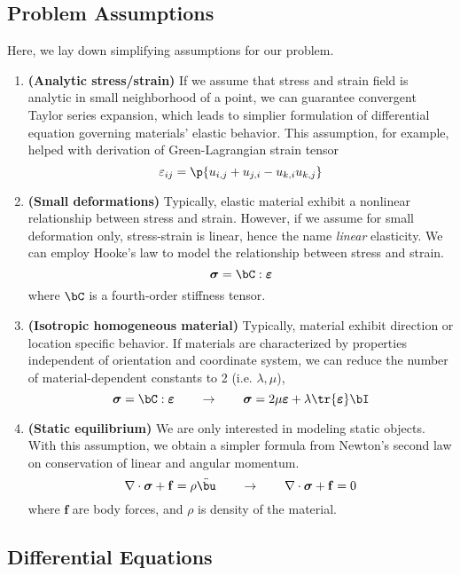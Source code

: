 \documentclass[11pt,titlepage]{article}
\newcommand{\bheading}[1]{\textbf{(#1)}}
\newcommand{\bsigma}{\boldsymbol{\sigma}}
\newcommand{\bepsilon}{\boldsymbol{\varepsilon}}
\renewcommand{\epsilon}{\varepsilon}
\renewcommand{\bf}{\mathbf{f}}
\begin{document}
\subsection{Problem Assumptions}

Here, we lay down simplifying assumptions for our problem.
\begin{enumerate}
    \item \bheading{Analytic stress/strain} If we assume that stress and strain field is analytic in small neighborhood of a point, we can guarantee convergent Taylor series expansion, which leads to simplier formulation of differential equation governing materials' elastic behavior. This assumption, for example, helped with derivation of Green-Lagrangian strain tensor
    \[
        \epsilon_{ij} = \p{u_{i,j} + u_{j,i} - u_{k,i}u_{k,j}}    
    \]
    \item \bheading{Small deformations} Typically, elastic material exhibit a nonlinear relationship between stress and strain. However, if we assume for small deformation only, stress-strain is linear, hence the name \textit{linear} elasticity. We can employ Hooke's law to model the relationship between stress and strain.
    \[
        \bsigma = \bC : \bepsilon
    \]
    where $\bC$ is a fourth-order stiffness tensor.
    \item \bheading{Isotropic homogeneous material} Typically, material exhibit direction or location specific behavior. If materials are characterized by properties independent of orientation and coordinate system, we can reduce the number of material-dependent constants to 2 (i.e. $\lambda,\mu$),
    \[
        \bsigma = \bC : \bepsilon
        \quad \quad \rightarrow \quad \quad
        \bsigma = 2\mu\bepsilon + \lambda \tr{\bepsilon} \bI
    \]
    \item \bheading{Static equilibrium} We are only interested in modeling static objects. With this assumption, we obtain a simpler formula from Newton's second law on conservation of linear and angular momentum.
    \[
        \nabla\cdot\bsigma + \bf = \rho \ddot{\bu}
        \quad \quad \rightarrow \quad \quad
        \nabla\cdot\bsigma + \bf = 0
    \]
    where $\bf$ are body forces, and $\rho$ is density of the material.
\end{enumerate}


\subsection{Differential Equations}
\end{document}
